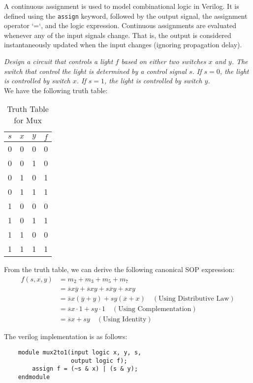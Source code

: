 \documentclass[11pt]{report}
\begin{document}
\begin{definition}
    A continuous assignment is used to model combinational logic in Verilog. It is defined using the \verb|assign| keyword, followed by the output signal, the assignment operator `=`, and the logic expression. Continuous assignments are evaluated whenever any of the input signals change. That is, the output is considered instantaneously updated when the input changes (ignoring propagation delay).
\end{definition}

\begin{example}
    \textit{Design a circuit that controls a light $f$ based on either two switches $x$ and $y$. The switch that control the light is determined by a control signal $s$. If $s = 0$, the light is controlled by switch $x$. If $s = 1$, the light is controlled by switch $y$.}
    \\
    We have the following truth table:

    \begin{table}[h!]
        \centering
        \begin{tabular}{|c|c|c|c|}
            \hline
            $s$ & $x$ & $y$ & $f$ \\
            \hline
            0 & 0 & 0 & 0 \\
            0 & 0 & 1 & 0 \\
            0 & 1 & 0 & 1 \\
            0 & 1 & 1 & 1 \\
            1 & 0 & 0 & 0 \\
            1 & 0 & 1 & 1 \\
            1 & 1 & 0 & 0 \\
            1 & 1 & 1 & 1 \\
            \hline
        \end{tabular}
        \caption{Truth Table for Mux}
        \label{tab:mux_truth_table}
    \end{table}
    
    From the truth table, we can derive the following canonical SOP expression:
    \begin{align*}
        f(s, x, y) &= m_2 + m_3 + m_5 + m_7 \\
        &= \overline{s}x\overline{y} + \overline{s}xy + s\overline{x}y + sxy \\
        &= \overline{s}x(\overline{y} + y) + sy(\overline{x} + x) \quad (\text{Using Distributive Law}) \\
        &= \overline{s}x \cdot 1 + sy \cdot 1 \quad (\text{Using Complementation}) \\
        &= \overline{s}x + sy \quad (\text{Using Identity})
    \end{align*}

    The verilog implementation is as follows:
    \begin{verbatim}
    module mux2to1(input logic x, y, s,
                   output logic f);
        assign f = (~s & x) | (s & y);
    endmodule
    \end{verbatim}
\end{example}
\end{document}

